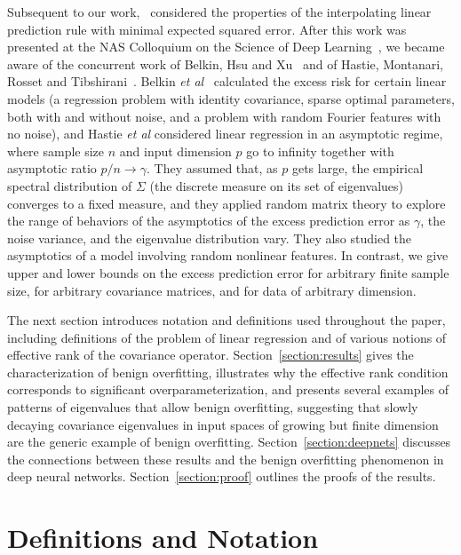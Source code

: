 \documentclass[11pt,notitlepage]{article}
\begin{document}
Subsequent
to our work,~\cite{mvs-hindr-19} considered the properties of the
interpolating linear prediction rule with minimal expected squared
error. After this work was presented at the NAS Colloquium on
the Science of Deep Learning~\cite{bllt-apincslt-19}, we became
aware of the concurrent work of Belkin, Hsu and
Xu~\cite{bhx-tmddwf-19} and of Hastie, Montanari, Rosset and
Tibshirani~\cite{hmrt-shdrlsi-19}.
Belkin {\it et al}~\cite{bhx-tmddwf-19} calculated the excess risk for
certain linear models (a regression problem with identity covariance,
sparse optimal parameters, both with and without noise, and a
problem with random Fourier features with no noise), and
Hastie {\it et al} considered linear regression
in an asymptotic regime, where sample size $n$ and input dimension
$p$ go to infinity together with asymptotic ratio $p/n\to\gamma$.
They assumed that, as $p$ gets large, the empirical spectral distribution
of $\Sigma$ (the discrete measure on its set of eigenvalues)
converges to a fixed measure, and they applied random matrix theory
to explore the range of behaviors of the asymptotics of the
excess prediction error as $\gamma$, the noise variance, and the
eigenvalue distribution vary. They also studied the asymptotics of a
model involving random nonlinear features.  In contrast,
we give upper and lower bounds on the excess prediction error
for arbitrary finite sample size, for arbitrary covariance matrices,
and for data of arbitrary dimension.

The next section introduces notation and definitions used
throughout the paper, including definitions of the problem of
linear regression and of various notions
of effective rank of the covariance operator.
Section~\ref{section:results} gives the characterization of benign
overfitting, illustrates why the effective rank condition
corresponds to significant overparameterization, and presents several
examples of patterns of eigenvalues that allow benign overfitting,
suggesting that slowly decaying covariance eigenvalues
in input spaces of growing but finite dimension are the generic
example of benign overfitting.
Section~\ref{section:deepnets} discusses the connections between these
results and the benign overfitting phenomenon in deep neural networks.
Section~\ref{section:proof} outlines the proofs of the results.

\section{Definitions and Notation}\label{section:notation}
\end{document}
